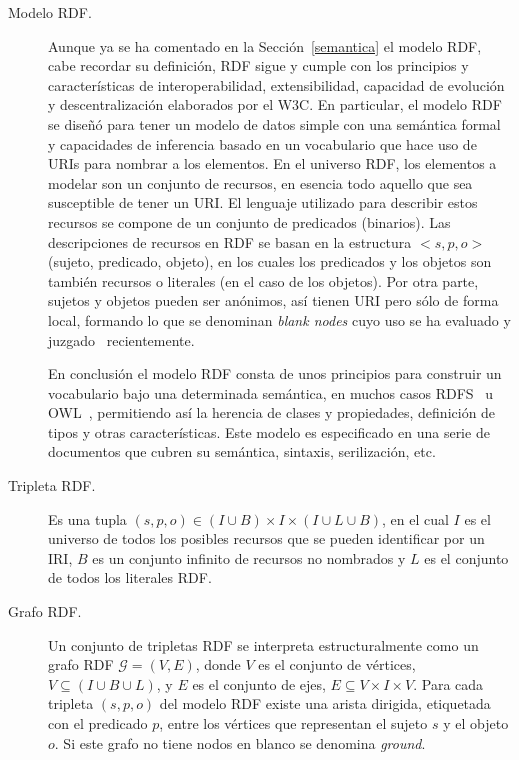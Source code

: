 \begin{description}
\item [Modelo RDF.] Aunque ya se ha comentado en la Sección~\ref{semantica} el modelo RDF, cabe recordar su definición, RDF
sigue y cumple con los principios y características de interoperabilidad, extensibilidad, capacidad de evolución
y descentralización elaborados por el \gls{W3C}. En particular, el modelo RDF se diseñó para tener un modelo de datos
simple con una semántica formal y capacidades de inferencia basado en un vocabulario que hace uso de URIs para nombrar
a los elementos. En el universo RDF, los elementos a modelar son un conjunto de recursos, en esencia todo
aquello que sea susceptible de tener un URI. El lenguaje utilizado para describir estos recursos se compone
de un conjunto de predicados (binarios). Las descripciones de recursos en RDF se basan en la estructura
$<s,p,o>$ (sujeto, predicado, objeto), en los cuales los predicados y los objetos son también recursos o 
literales (en el caso de los objetos). Por otra parte, sujetos y objetos pueden ser anónimos, así tienen URI
pero sólo de forma local, formando lo que se denominan \textit{blank nodes} cuyo uso se ha evaluado y juzgado~\cite{DBLP:conf/semweb/MalleaAHP11} 
recientemente.

En conclusión el modelo RDF consta de unos principios para construir un vocabulario 
bajo una determinada semántica, en muchos casos RDFS~\cite{RDFS} u \gls{OWL}~\cite{owl2-primer}, permitiendo así la herencia
de clases y propiedades, definición de tipos y otras características. Este modelo
es especificado en una serie de documentos que cubren su semántica, sintaxis, serilización, etc.

\item [Tripleta RDF.] Es una tupla $(s,p,o) \in (I \cup B) \times I \times 
(I \cup L \cup B)$, en el cual $I$ es el universo de todos los posibles recursos que se pueden identificar
por un IRI, $B$ es un conjunto infinito de recursos no nombrados y $L$ es el conjunto
de todos los literales RDF.

\item [Grafo RDF.] Un conjunto de tripletas RDF se interpreta estructuralmente como un grafo
RDF $\mathcal{G} =(V,E)$, donde $V$ es el conjunto de vértices, $V \subseteq (I \cup B \cup L)$,
y $E$ es el conjunto de ejes, $E \subseteq V \times I \times 
V$. Para cada tripleta $(s,p,o)$ del modelo RDF existe
una arista dirigida, etiquetada con el predicado $p$, entre los vértices que representan el sujeto $s$ y el objeto $o$. Si este
grafo no tiene nodos en blanco se denomina \textit{ground}.


\end{description}

